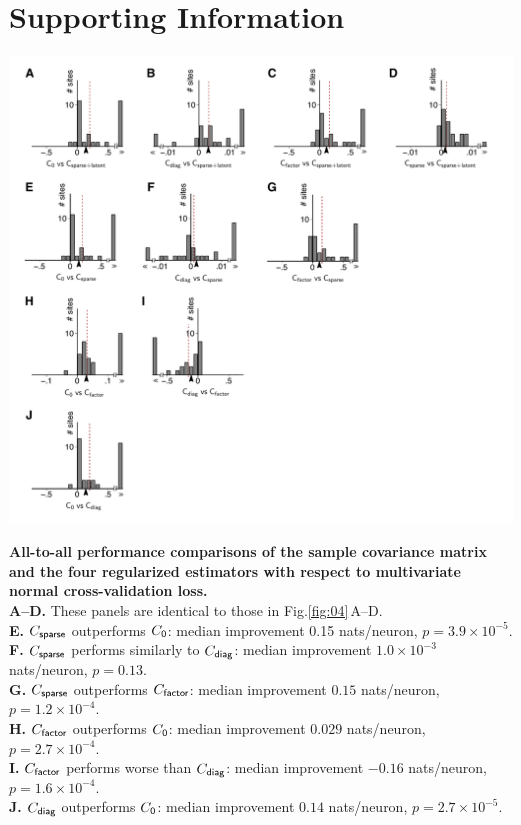 \documentclass[10pt]{article}
\newcommand{\figref}[2]{Fig.\;\ref{fig:#1}\,#2}
\begin{document}
\newpage
\section*{Supporting Information}
\setcounter{figure}{0}
\renewcommand{\figurename}{Figure S}


\begin{FPfigure}
\begin{center}
\includegraphics{./figures/Figure-Supp01.pdf}
\end{center}
\caption{{\bf All-to-all performance comparisons of the sample covariance matrix and the four regularized estimators with respect to multivariate normal cross-validation loss.}
\\{\bf A--D.} These panels are identical to those in \figref{04}{A--D}.
\\{\bf E.} $C_{\sf sparse}$ outperforms $C_{\sf 0}$: median improvement 0.15 nats/neuron, $p=3.9\times 10^{-5}$.
\\{\bf F.} $C_{\sf sparse}$ performs similarly to $C_{\sf diag}$: median improvement $1.0\times10^{-3}$ nats/neuron, $p=0.13$.
\\{\bf G.} $C_{\sf sparse}$ outperforms $C_{\sf factor}$: median improvement $0.15$ nats/neuron, $p=1.2\times10^{-4}$.
\\{\bf H.} $C_{\sf factor}$ outperforms $C_{\sf 0}$: median improvement $0.029$ nats/neuron, $p=2.7\times10^{-4}$.
\\{\bf I.} $C_{\sf factor}$ performs worse than $C_{\sf diag}$: median improvement $-0.16$ nats/neuron, $p=1.6\times10^{-4}$.
\\{\bf J.} $C_{\sf diag}$ outperforms $C_{\sf 0}$: median improvement $0.14$ nats/neuron, $p=2.7\times10^{-5}$.
}
\label{supp:01}
\end{FPfigure}
\end{document}
